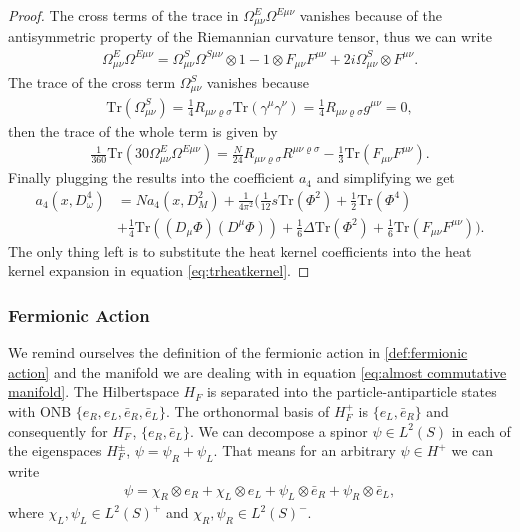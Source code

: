 \begin{proof}
     The cross terms of the trace in $\Omega_{\mu\nu}^E\Omega^{E\mu\nu}$
     vanishes because of the antisymmetric property of the Riemannian
     curvature tensor, thus we can write
     \begin{align}
         \Omega_{\mu\nu}^E\Omega^{E\mu\nu} = \Omega_{\mu\nu}^S\Omega^{S\mu\nu}
         \otimes 1 - 1\otimes F_{\mu\nu}F^{\mu\nu} + 2i\Omega_{\mu\nu}^S
         \otimes F^{\mu\nu}.
     \end{align}
     The trace  of the cross term $\Omega^{S}_{\mu\nu}$ vanishes because
     \begin{align}
         \text{Tr}(\Omega^{S}_{\mu\nu}) = \frac{1}{4}
         R_{\mu\nu\varrho\sigma}\text{Tr}(\gamma^\mu\gamma^\nu) = \frac{1}{4}
         R_{\mu\nu\varrho\sigma}g^{\mu\nu} =0,
     \end{align}
     then the trace of the whole term is given by
     \begin{align}
         \frac{1}{360}\text{Tr}(30\Omega^E_{\mu\nu}\Omega^{E\mu\nu}) =
         \frac{N}{24}R_{\mu\nu\varrho\sigma}R^{\mu\nu\varrho\sigma}
         -\frac{1}{3}\text{Tr}(F_{\mu\nu}F^{\mu\nu}).
     \end{align}
     Finally plugging the results into the coefficient $a_4$ and simplifying we get
     \begin{align}
         a_4(x, D_\omega^4) &= Na_4(x, D_M^2) + \frac{1}{4\pi^2}\bigg(\frac{1}{12} s
         \text{Tr}(\Phi^2) + \frac{1}{2}\text{Tr}(\Phi^4) \\
         &+ \frac{1}{4}
         \text{Tr}((D_\mu\Phi)(D^\mu \Phi)) + \frac{1}{6}
         \Delta\text{Tr}(\Phi^2) + \frac{1}{6}
         \text{Tr}(F_{\mu\nu}F^{\mu\nu})\bigg).
     \end{align}
     The only thing left is to substitute the heat kernel coefficients into the
     heat kernel expansion in equation \ref{eq:trheatkernel}.
\end{proof}

\subsubsection{Fermionic Action}
We remind ourselves the definition of the fermionic action in
\ref{def:fermionic action} and the manifold we are dealing with in equation
\ref{eq:almost commutative manifold}. The Hilbertspace $H_F$ is separated
into the particle-antiparticle states with ONB $\{e_R, e_L, \bar{e}_R,
\bar{e}_L\}$. The orthonormal basis of $H_F^+$ is $\{e_L, \bar{e}_R\}$ and
consequently for $H_F^-$, $\{e_R, \bar{e}_L\}$. We can decompose a spinor
$\psi \in L^2(S)$ in each of the eigenspaces $H_F^\pm$, $\psi = \psi_R+
\psi_L$. That means for an arbitrary $\psi \in H^+$ we can write
\begin{align}
    \psi = \chi_R \otimes e_R + \chi_L \otimes e_L + \psi_L \otimes
    \bar{e}_R+
    \psi_R \otimes \bar{e}_L,
\end{align}
where $\chi_L, \psi_L \in L^2(S)^+$ and $\chi_R, \psi_R \in L^2(S)^-$.

